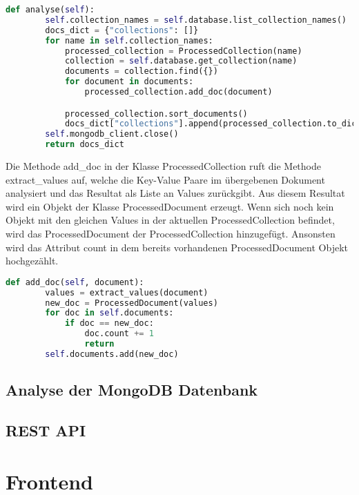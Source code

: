 \begin{lstlisting}[language=python, caption={DatabaseAnalysis.analyse},label={lst:backend_analyse}]
    def analyse(self):
        self.collection_names = self.database.list_collection_names()
        docs_dict = {"collections": []}
        for name in self.collection_names:
            processed_collection = ProcessedCollection(name)
            collection = self.database.get_collection(name)
            documents = collection.find({})
            for document in documents:
                processed_collection.add_doc(document)

            processed_collection.sort_documents()
            docs_dict["collections"].append(processed_collection.to_dict())
        self.mongodb_client.close()
        return docs_dict
\end{lstlisting}

Die Methode add\_doc in der Klasse ProcessedCollection ruft die Methode extract\_values auf, welche die Key-Value Paare im übergebenen Dokument analysiert und das Resultat als Liste an Values zurückgibt.
Aus diesem Resultat wird ein Objekt der Klasse ProcessedDocument erzeugt.
Wenn sich noch kein Objekt mit den gleichen Values in der aktuellen ProcessedCollection befindet, wird das ProcessedDocument der ProcessedCollection hinzugefügt.
Ansonsten wird das Attribut count in dem bereits vorhandenen ProcessedDocument Objekt hochgezählt.


\begin{lstlisting}[language=python, caption={ProcessedCollection.add\_doc},label={lst:backend_add_doc}]
    def add_doc(self, document):
        values = extract_values(document)
        new_doc = ProcessedDocument(values)
        for doc in self.documents:
            if doc == new_doc:
                doc.count += 1
                return
        self.documents.add(new_doc)
\end{lstlisting}


\subsection{Analyse der MongoDB Datenbank}
\label{sub:mongoDB_analyse}

\subsection{REST API}
\label{sub:rest_api}

\section{Frontend}
\label{sec:frontend}

\subsection{}
\label{sub:rest_api}

